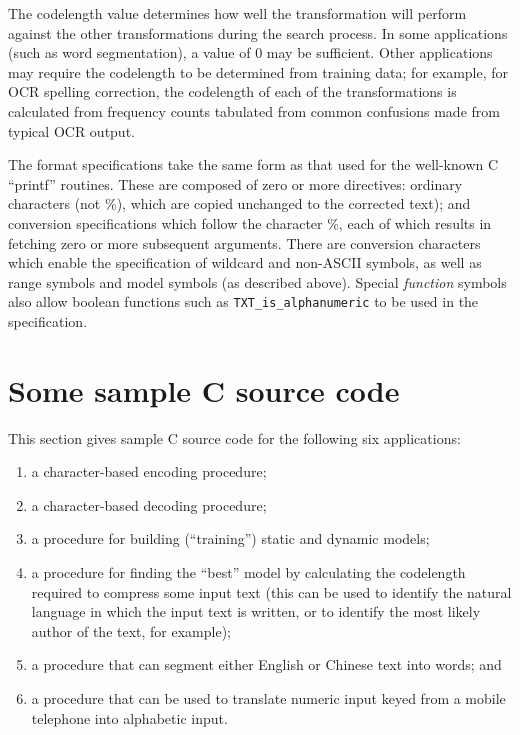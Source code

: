 \documentclass[11pt]{article}
\begin{document}
The codelength value determines how well the transformation will perform against the other
transformations during the search process. In some applications (such as word segmentation),
a value of 0 may be sufficient. Other applications may require the codelength to be
determined from training data; for example, for OCR spelling correction, the codelength
of each of the transformations is calculated from frequency counts tabulated from common
confusions made from typical OCR output.

The format specifications take the same form as that used for the well-known C ``printf'' routines.
These are  composed of zero or more directives: ordinary characters (not \%),
which are copied unchanged to the corrected text); and conversion specifications which follow
the character \%, each of which results in fetching zero or more subsequent arguments.
There are conversion characters which enable the specification of wildcard and non-ASCII symbols,
as well as range symbols and model symbols (as described above). Special {\em function} symbols
also allow boolean functions such as \verb|TXT_is_alphanumeric| to be used in the specification.

\section{Some sample C source code}

\label{section.samples}

This section gives sample C source code for the following six applications:

\begin{enumerate}
\item a character-based encoding procedure;
\item a character-based decoding procedure;
\item a procedure for building (``training'') static and dynamic models;
\item a procedure for finding the ``best'' model by calculating the codelength
      required to compress some input text (this can be used to identify the
      natural language in which the input text is written, or to identify the
      most likely author of the text, for example);
\item a procedure that can segment either English or Chinese text into words; and
\item a procedure that can be used to translate numeric input keyed
      from a mobile telephone into alphabetic input.
\end{enumerate}
\end{document}
